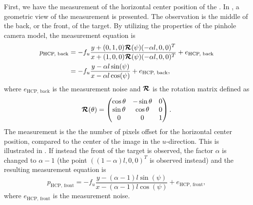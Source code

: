 First, we have the measurement of the horizontal center position of the \abbrROI.
In , a geometric view of the measurement is presented.
The observation is the middle of the back, or the front, of the target.
By utilizing the properties of the pinhole camera model, the measurement equation is
%
\begin{equation}
\begin{split}
    p_{\text{HCP, back}} &= -f_u \frac{y + (0,1,0) \bm{\mathcal{R}}(\psi) (- \alpha l,0,0)^T}{x + (1,0,0) \bm{\mathcal{R}}(\psi) (- \alpha l,0,0)^T} + e_{\text{HCP, back}}\\
    &= -f_u \frac{y - \alpha l \sin(\psi)}{x - \alpha l \cos(\psi)} + e_{\text{HCP, back}},
\end{split}
\end{equation}
%
where $e_{\text{HCP, back}}$ is the measurement noise and $\bm{\mathcal{R}}$ is the  rotation matrix defined as
\begin{equation*}
	\bm{\mathcal{R}}(\theta) =
	\begin{pmatrix}
		\cos\theta & -\sin\theta & 0 \\
		\sin\theta & \cos\theta & 0 \\
		0 & 0 & 1
	\end{pmatrix}.
\end{equation*}
The measurement is the the number of pixels offset for the horizontal center position, compared to the center of the image in the $u$-direction.
This is illustrated in .
If instead the front of the target is observed, the factor $\alpha$ is changed to $\alpha-1$ (the point $((1-\alpha)l,0,0)^T$ is observed instead) and the resulting measurement equation is
%
\begin{equation}
    p_{\text{HCP, front}} = -f_u \frac{y - (\alpha - 1) l \sin(\psi)}{x - (\alpha - 1) l \cos(\psi)} + e_{\text{HCP, front}},
\end{equation}
%
where $e_{\text{HCP, front}}$ is the measurement noise.

